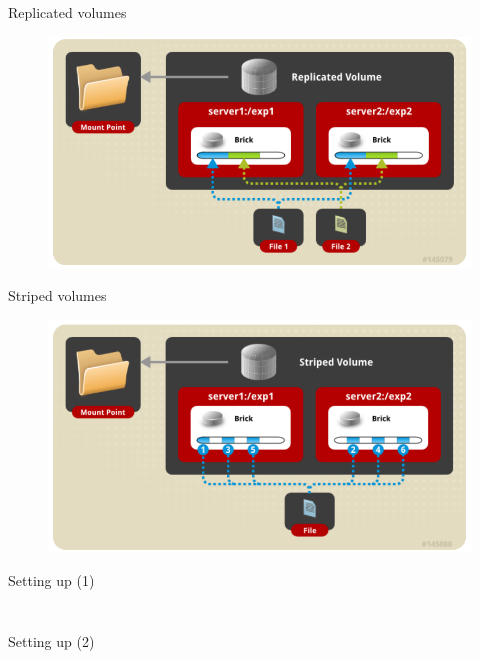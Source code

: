 \documentclass{beamer}
\begin{document}
\begin{frame}{Replicated volumes}
	\begin{figure}[h]
		\centering
		\includegraphics[width=0.8\linewidth]{replicated.png}
	\end{figure}
\end{frame}

\begin{frame}{Striped volumes}
	\begin{figure}[h]
		\centering
		\includegraphics[width=0.8\linewidth]{striped.png}
	\end{figure}
\end{frame}

\begin{frame}{Setting up (1)}
	\inputminted{bash}{sc1}
	\inputminted{bash}{sc2}
\end{frame}

\begin{frame}{Setting up (2)}
	\inputminted{bash}{sc3}
\end{frame}
\end{document}

